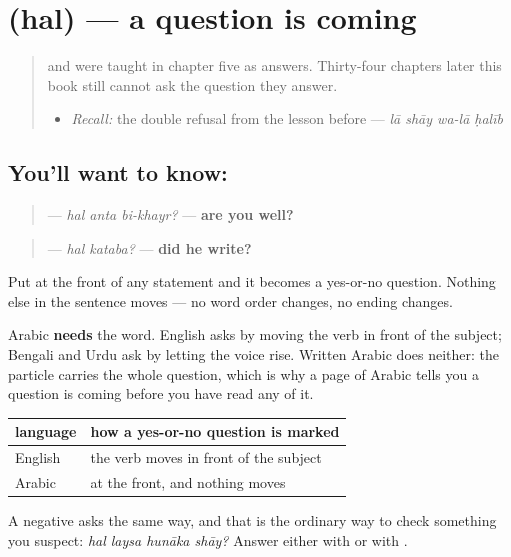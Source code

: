 \section[\texorpdfstring{\ar{هل} (hal)}{هل (hal)}]{ (hal) — a question is coming}

\label{lesson:AR-C39-hal}



\begin{quote}
\textbf{} and \textbf{} were taught in chapter five as answers. Thirty-four chapters later this book still cannot ask the question they answer.

\begin{itemize}
\raggedright
  \item \emph{Recall:} the double refusal from the lesson before — \emph{lā shāy wa-lā ḥalīb}
\end{itemize}
\end{quote}

\subsection*{You'll want to know: }
\begin{quote}
\textbf{  } — \emph{hal anta bi-khayr?} — \textbf{are you well?}
\end{quote}

\begin{quote}
\textbf{ } — \emph{hal kataba?} — \textbf{did he write?}
\end{quote}

Put \textbf{} at the front of any statement and it becomes a yes-or-no question. Nothing else in the sentence moves — no word order changes, no ending changes.

Arabic \textbf{needs} the word. English asks by moving the verb in front of the subject; Bengali and Urdu ask by letting the voice rise. Written Arabic does neither: the particle carries the whole question, which is why a page of Arabic tells you a question is coming before you have read any of it.

\begin{grammarlens}[title={Grammar Lens: what the particle replaces}]
\noindent
\begin{tabularx}{\linewidth}{@{}>{\raggedright\arraybackslash}X>{\raggedright\arraybackslash}X@{}}
\toprule
\textbf{language} & \textbf{how a yes-or-no question is marked} \\
\midrule
English & the verb moves in front of the subject \\
Arabic & \textbf{\ar{هل}} at the front, and nothing moves \\
\bottomrule
\end{tabularx}

A negative asks the same way, and that is the ordinary way to check something you suspect: \emph{hal laysa hunāka shāy?} Answer either with \textbf{} or with \textbf{}.
\end{grammarlens}

